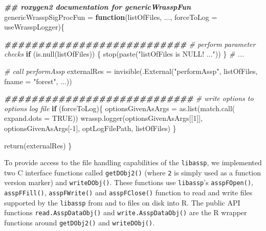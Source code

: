 \documentclass[
]{book}
\newenvironment{Shaded}{\begin{snugshade}}{\end{snugshade}}
\newcommand{\AttributeTok}[1]{\textcolor[rgb]{0.77,0.63,0.00}{#1}}
\newcommand{\CommentTok}[1]{\textcolor[rgb]{0.56,0.35,0.01}{\textit{#1}}}
\newcommand{\ConstantTok}[1]{\textcolor[rgb]{0.00,0.00,0.00}{#1}}
\newcommand{\ControlFlowTok}[1]{\textcolor[rgb]{0.13,0.29,0.53}{\textbf{#1}}}
\newcommand{\DecValTok}[1]{\textcolor[rgb]{0.00,0.00,0.81}{#1}}
\newcommand{\DocumentationTok}[1]{\textcolor[rgb]{0.56,0.35,0.01}{\textbf{\textit{#1}}}}
\newcommand{\FunctionTok}[1]{\textcolor[rgb]{0.00,0.00,0.00}{#1}}
\newcommand{\NormalTok}[1]{#1}
\newcommand{\OtherTok}[1]{\textcolor[rgb]{0.56,0.35,0.01}{#1}}
\newcommand{\SpecialCharTok}[1]{\textcolor[rgb]{0.00,0.00,0.00}{#1}}
\newcommand{\StringTok}[1]{\textcolor[rgb]{0.31,0.60,0.02}{#1}}
\begin{document}
\begin{Shaded}
\begin{Highlighting}[]
\DocumentationTok{\#\#\textquotesingle{} roxygen2 documentation for genericWrasspFun}
\NormalTok{genericWrasspSigProcFun }\OtherTok{=} \ControlFlowTok{function}\NormalTok{(listOfFiles,}
\NormalTok{                                   ...,}
                                   \AttributeTok{forceToLog =}\NormalTok{ useWrasspLogger)\{}
  
  \DocumentationTok{\#\#\#\#\#\#\#\#\#\#\#\#\#\#\#\#\#\#\#\#\#\#\#\#\#\#\#}
  \CommentTok{\# perform parameter checks}
  \ControlFlowTok{if}\NormalTok{ (}\FunctionTok{is.null}\NormalTok{(listOfFiles)) \{}
        \FunctionTok{stop}\NormalTok{(}\FunctionTok{paste}\NormalTok{(}\StringTok{"listOfFiles is NULL! ..."}\NormalTok{))}
\NormalTok{  \}}
  \CommentTok{\# ...}
  
  \CommentTok{\# call performAssp}
\NormalTok{  externalRes }\OtherTok{=} \FunctionTok{invisible}\NormalTok{(}\FunctionTok{.External}\NormalTok{(}\StringTok{"performAssp"}\NormalTok{, listOfFiles, }
                                    \AttributeTok{fname =} \StringTok{"forest"}\NormalTok{, ...))}
  
  
  \DocumentationTok{\#\#\#\#\#\#\#\#\#\#\#\#\#\#\#\#\#\#\#\#\#\#\#\#\#\#\#\#}
  \CommentTok{\# write options to options log file}
  \ControlFlowTok{if}\NormalTok{ (forceToLog)\{}
\NormalTok{      optionsGivenAsArgs }\OtherTok{=} \FunctionTok{as.list}\NormalTok{(}\FunctionTok{match.call}\NormalTok{(}
        \AttributeTok{expand.dots =} \ConstantTok{TRUE}\NormalTok{))}
      \FunctionTok{wrassp.logger}\NormalTok{(optionsGivenAsArgs[[}\DecValTok{1}\NormalTok{]], }
\NormalTok{                    optionsGivenAsArgs[}\SpecialCharTok{{-}}\DecValTok{1}\NormalTok{],}
\NormalTok{                    optLogFilePath, listOfFiles)}
\NormalTok{  \}    }
  
  \FunctionTok{return}\NormalTok{(externalRes)}
\NormalTok{\}}
\end{Highlighting}
\end{Shaded}

To provide access to the file handling capabilities of the \texttt{libassp}, we implemented two C interface functions called \texttt{getDObj2()} (where \texttt{2} is simply used as a function version marker) and \texttt{writeDObj()}. These functions use \texttt{libassp}'s \texttt{asspFOpen()}, \texttt{asspFFill()}, \texttt{asspFWrite()} and \texttt{asspFClose()} function to read and write files supported by the \texttt{libassp} from and to files on disk into R. The public API functions \texttt{read.AsspDataObj()} and \texttt{write.AsspDataObj()} are the R wrapper functions around \texttt{getDObj2()} and \texttt{writeDObj()}.
\end{document}
